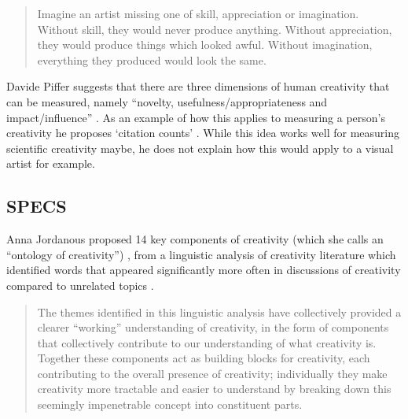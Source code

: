\begin{quotation}
  Imagine an artist missing one of skill, appreciation or imagination. Without skill, they would never produce anything. Without appreciation, they would produce things which looked awful. Without imagination, everything they produced would look the same. 
\end{quotation}

\spirals

Davide Piffer suggests that there are three dimensions of human creativity that can be measured, namely ``novelty, usefulness/appropriateness and impact/influence'' \autocite*{Piffer2012}. As an example of how this applies to measuring a person's creativity he proposes `citation counts' \autocite{Piffer2012}. While this idea works well for measuring scientific creativity maybe, he does not explain how this would apply to a visual artist for example.


\subsection{SPECS}
\label{s:specs}

Anna Jordanous proposed 14 key components of creativity (which she calls an ``ontology of creativity'') \autocite*{Jordanous2012}, from a linguistic analysis of creativity literature which identified words that appeared significantly more often in discussions of creativity compared to unrelated topics \autocite*{Jordanous2012}.

\begin{quotation}
  The themes identified in this linguistic analysis have collectively provided a clearer ``working'' understanding of creativity, in the form of components that collectively contribute to our understanding of what creativity is. Together these components act as building blocks for creativity, each contributing to the overall presence of creativity; individually they make creativity more tractable and easier to understand by breaking down this seemingly impenetrable concept into constituent parts. 
\end{quotation}

